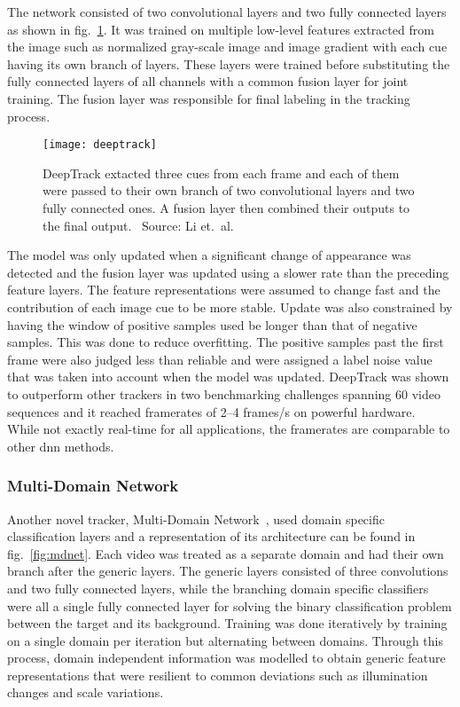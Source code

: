 The network consisted of two convolutional layers and two fully connected layers as shown in fig.~\ref{fig:deeptrack}. It was trained on multiple low-level features extracted from the image such as normalized gray-scale image and image gradient with each cue having its own branch of layers. These layers were trained before substituting the fully connected layers of all channels with a common fusion layer for joint training. The fusion layer was responsible for final labeling in the tracking process.~\cite{DEEPTRACK}

\begin{figure}[H]
\centering
\texttt{[image: deeptrack]}
\caption{DeepTrack extacted three cues from each frame and each of them were passed to their own branch of two convolutional layers and two fully connected ones. A fusion layer then combined their outputs to the final output.~\cite{DEEPTRACK} Source: Li et.~al.~\cite{DEEPTRACK}}\label{fig:deeptrack}
\end{figure}

The model was only updated when a significant change of appearance was detected and the fusion layer was updated using a slower rate than the preceding feature layers. The feature representations were assumed to change fast and the contribution of each image cue to be more stable. Update was also constrained by having the window of positive samples used be longer than that of negative samples. This was done to reduce overfitting. The positive samples past the first frame were also judged less than reliable and were assigned a label noise value that was taken into account when the model was updated. DeepTrack was shown to outperform other trackers in two benchmarking challenges spanning 60 video sequences and it reached framerates of 2--4 frames/s on powerful hardware.~\cite{DEEPTRACK} While not exactly real-time for all applications, the framerates are comparable to other \ac{dnn} methods.

\subsubsection{Multi-Domain Network}\label{sssec:mdn}
Another novel tracker, Multi-Domain Network~\cite{MDNET}, used domain specific classification layers and a representation of its architecture can be found in fig.~\ref{fig:mdnet}. Each video was treated as a separate domain and had their own branch after the generic layers. The generic layers consisted of three convolutions and two fully connected layers, while the branching domain specific classifiers were all a single fully connected layer for solving the binary classification problem between the target and its background. Training was done iteratively by training on a single domain per iteration but alternating between domains. Through this process, domain independent information was modelled to obtain generic feature representations that were resilient to common deviations such as illumination changes and scale variations.~\cite{MDNET}

